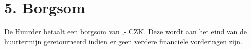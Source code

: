 \section*{5. Borgsom}
De Huurder betaalt een borgsom van \DepositAmount,- CZK. Deze wordt aan het eind van de huurtermijn geretourneerd indien er geen verdere financiële vorderingen zijn.
